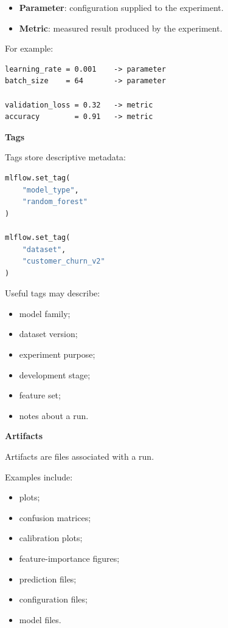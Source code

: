 \documentclass[11pt,letterpaper]{article}
\begin{document}
\begin{itemize}[leftmargin=*]
    \item \textbf{Parameter}: configuration supplied to the experiment.
    \item \textbf{Metric}: measured result produced by the experiment.
\end{itemize}

For example:

\begin{lstlisting}
learning_rate = 0.001    -> parameter
batch_size    = 64       -> parameter

validation_loss = 0.32   -> metric
accuracy        = 0.91   -> metric
\end{lstlisting}

\textbf{Tags}

Tags store descriptive metadata:

\begin{lstlisting}[language=Python]
mlflow.set_tag(
    "model_type",
    "random_forest"
)

mlflow.set_tag(
    "dataset",
    "customer_churn_v2"
)
\end{lstlisting}

Useful tags may describe:

\begin{itemize}[leftmargin=*]
    \item model family;
    \item dataset version;
    \item experiment purpose;
    \item development stage;
    \item feature set;
    \item notes about a run.
\end{itemize}

\textbf{Artifacts}

Artifacts are files associated with a run.

Examples include:

\begin{itemize}[leftmargin=*]
    \item plots;
    \item confusion matrices;
    \item calibration plots;
    \item feature-importance figures;
    \item prediction files;
    \item configuration files;
    \item model files.
\end{itemize}
\end{document}
